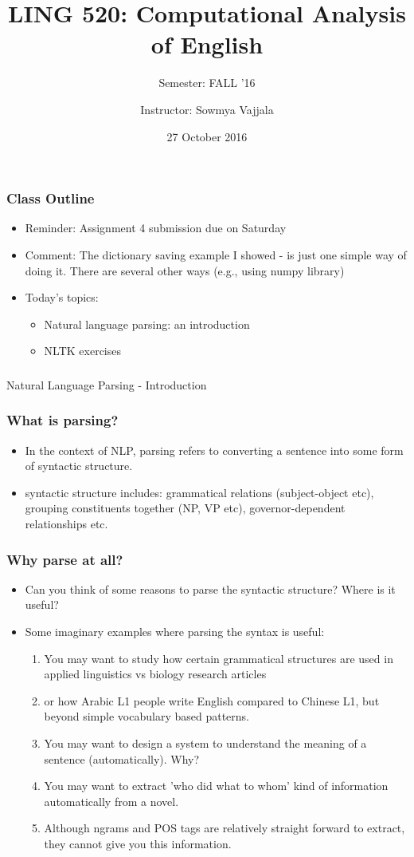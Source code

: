 \documentclass{beamer}
\author[Sowmya Vajjala]{Instructor: Sowmya Vajjala}
\title[LING 520]{LING 520: Computational Analysis of English}
\subtitle{Semester: FALL '16}
\date{27 October 2016}
\institute{Iowa State University, USA}
\begin{document}
\begin{frame}\titlepage
\end{frame}

\begin{frame}
\frametitle{Class Outline}
\begin{itemize}
\item Reminder: Assignment 4 submission due on Saturday
\item Comment: The dictionary saving example I showed -  is just one simple way of doing it. There are several other ways (e.g., using numpy library)
\item Today's topics:
\begin{itemize}
\item Natural language parsing: an introduction
\item NLTK exercises
\end{itemize}
\end{itemize}
\end{frame}

\begin{frame}
\frametitle{}
\Large Natural Language Parsing - Introduction
\end{frame}

\begin{frame}
\frametitle{What is parsing?}
\begin{itemize}
\item In the context of NLP, parsing refers to converting a sentence into some form of syntactic structure.
\item syntactic structure includes: grammatical relations (subject-object etc), grouping constituents together (NP, VP etc), governor-dependent relationships etc.
\end{itemize}
\end{frame}

\begin{frame}
\frametitle{Why parse at all?}
\begin{itemize}
\item Can you think of some reasons to parse the syntactic structure? Where is it useful? \pause
\item Some imaginary examples where parsing the syntax is useful:
\begin{enumerate}
\item You may want to study how certain grammatical structures are used in applied linguistics vs biology research articles
\item or how Arabic L1 people write English compared to Chinese L1, but beyond simple vocabulary based patterns. \pause
\item You may want to design a system to understand the meaning of a sentence (automatically). Why? 
\item You may want to extract 'who did what to whom' kind of information automatically from a novel. \pause 
\item Although ngrams and POS tags are relatively straight forward to extract, they cannot give you this information. 
\end{enumerate}
\end{itemize}
\end{frame}
\end{document}
